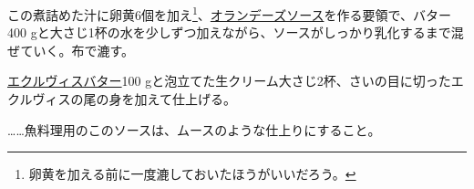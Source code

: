 \begin{recette}
この煮詰めた汁に卵黄6個を加え\footnote{卵黄を加える前に一度漉しておいたほうがいいだろう。}、\protect\hyperlink{sauce-hollandaise}{オランデーズソース}を作る要領で、バター400
gと大さじ1\undemi{}杯の水を少しずつ加えながら、ソースがしっかり乳化するまで混ぜていく。布で漉す。

\protect\hyperlink{beurre-d-ecrevisse}{エクルヴィスバター}100
gと泡立てた生クリーム大さじ2杯、さいの目に切ったエクルヴィスの尾の身を加えて仕上げる。

\ldots{}\ldots{}魚料理用のこのソースは、ムースのような仕上りにすること。

\end{recette}